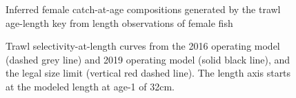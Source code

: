 \documentclass[11pt]{book}
\begin{document}
\newpage
\begin{figure}[htb]

{\centering {} 

}

\caption{Inferred female catch-at-age compositions generated by the trawl age-length key from length observations of female fish}\label{fig:unnamed-chunk-33}
\end{figure}
\newpage
\begin{figure}[htb]

{\centering {} 

}

\caption{Trawl selectivity-at-length curves from the 2016 operating model (dashed grey line) and 2019 operating model (solid black line), and the legal size limit (vertical red dashed line). The length axis starts at the modeled length at age-1 of 32cm.}\label{fig:unnamed-chunk-34}
\end{figure}
\clearpage
\end{document}
